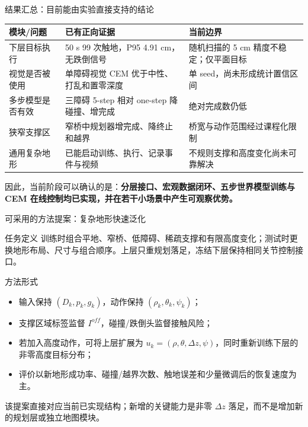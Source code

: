 \documentclass[aspectratio=169,10pt]{beamer}
\begin{document}
\begin{frame}{结果汇总：目前能由实验直接支持的结论}
\small
\begin{tabular}{p{}p{}p{}}
\toprule
模块/问题 & 已有正向证据 & 当前边界\\
\midrule
下层目标执行 & 50 s 99 次触地，P95 4.91 cm，无跌倒信号 & 随机扫描的 5 cm 精度不稳定；仅平面目标\\
视觉是否被使用 & 单障碍视觉 CEM 优于中性、打乱和置零深度 & 单 seed，尚未形成统计置信区间\\
多步模型是否有效 & 三障碍 5-step 相对 one-step 降碰撞、增完成 & 绝对完成数仍低\\
狭窄支撑区 & 窄桥中规划器增完成、降终止和越界 & 桥宽与动作范围经过课程化限制\\
通用复杂地形 & 已能启动训练、执行、记录事件与视频 & 不规则支撑和高度变化尚未可靠解决\\
\bottomrule
\end{tabular}
\vspace{0.7em}
因此，当前阶段可以确认的是：\textbf{分层接口、宏观数据闭环、五步世界模型训练与 CEM 在线控制均已实现，并在若干小场景中产生可观察优势。}
\end{frame}

\begin{frame}{可采用的方法提案：复杂地形快速泛化}
\small
\begin{block}{任务定义}
训练时组合平地、窄桥、低障碍、稀疏支撑和有限高度变化；测试时更换地形布局、尺寸与组合顺序。上层只重规划落足，冻结下层保持相同关节控制接口。
\end{block}
\begin{block}{方法形式}
\begin{itemize}
  \item 输入保持 $(D_k,p_k,g_k)$，动作保持 $(\rho_k,\theta_k,\psi_k)$；
  \item 支撑区域标签监督 $I^{off}$，碰撞/跌倒头监督接触风险；
  \item 若加入高度动作，可将上层扩展为 $u_k=(\rho,\theta,\Delta z,\psi)$，同时重新训练下层的非零高度目标分布；
  \item 评价以新地形成功率、碰撞/越界次数、触地误差和少量微调后的恢复速度为主。
\end{itemize}
\end{block}
该提案直接对应当前已实现结构；新增的关键能力是非零 $\Delta z$ 落足，而不是增加新的规划层或独立地图模块。
\end{frame}
\end{document}
